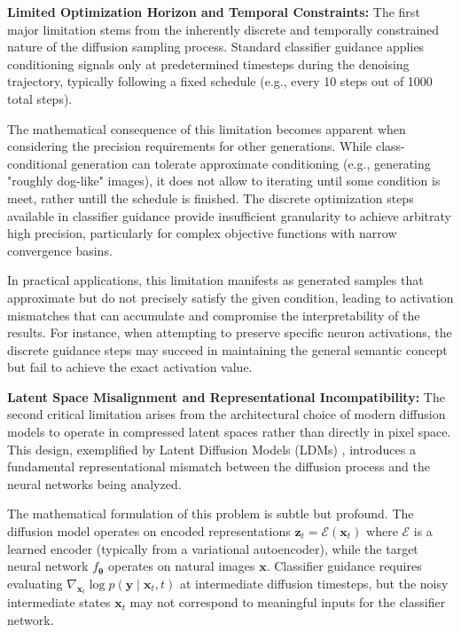 \textbf{Limited Optimization Horizon and Temporal Constraints:} The first major limitation stems from the inherently discrete and temporally constrained nature of the diffusion sampling process. Standard classifier guidance applies conditioning signals only at predetermined timesteps during the denoising trajectory, typically following a fixed schedule (e.g., every 10 steps out of 1000 total steps).

The mathematical consequence of this limitation becomes apparent when considering the precision requirements for other generations. While class-conditional generation can tolerate approximate conditioning (e.g., generating "roughly dog-like" images), it does not allow to iterating until some condition is meet, rather untill the schedule is finished. The discrete optimization steps available in classifier guidance provide insufficient granularity to achieve arbitraty high precision, particularly for complex objective functions with narrow convergence basins.

In practical applications, this limitation manifests as generated samples that approximate but do not precisely satisfy the given condition, leading to activation mismatches that can accumulate and compromise the interpretability of the results. For instance, when attempting to preserve specific neuron activations, the discrete guidance steps may succeed in maintaining the general semantic concept but fail to achieve the exact activation value.

\textbf{Latent Space Misalignment and Representational Incompatibility:} The second critical limitation arises from the architectural choice of modern diffusion models to operate in compressed latent spaces rather than directly in pixel space. This design, exemplified by Latent Diffusion Models (LDMs) \citep{rombach2022highresolutionimagesynthesislatent}, introduces a fundamental representational mismatch between the diffusion process and the neural networks being analyzed.

The mathematical formulation of this problem is subtle but profound. The diffusion model operates on encoded representations $\mathbf{z}_t = \mathcal{E}(\mathbf{x}_t)$ where $\mathcal{E}$ is a learned encoder (typically from a variational autoencoder), while the target neural network $f_{\boldsymbol{\theta}}$ operates on natural images $\mathbf{x}$. Classifier guidance requires evaluating $\nabla_{\mathbf{x}_t} \log p(\mathbf{y} \mid \mathbf{x}_t, t)$ at intermediate diffusion timesteps, but the noisy intermediate states $\mathbf{x}_t$ may not correspond to meaningful inputs for the classifier network.

